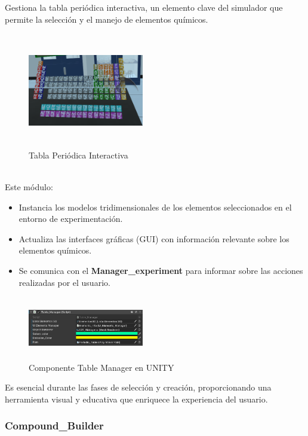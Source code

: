 \documentclass[conference]{IEEEtran}
\begin{document}
Gestiona la tabla periódica interactiva, un elemento clave del simulador que permite la selección y el manejo de elementos químicos. 
\begin{figure}[thbp]
    \centering
    \includegraphics[width=0.45\textwidth, height = 5cm]{img/GUI/Tabla_Periodica.png}
    \caption{Tabla Periódica Interactiva}
    \label{fig:Tabla Periódica Interactiva}
\end{figure}
\\
Este módulo:
\begin{itemize}
    \item Instancia los modelos tridimensionales de los elementos seleccionados en el entorno de experimentación.
    \item Actualiza las interfaces gráficas (GUI) con información relevante sobre los elementos químicos.
    \item Se comunica con el \textbf{Manager\_experiment} para informar sobre las acciones realizadas por el usuario.
\end{itemize}
\begin{figure}[thbp]
    \centering
    \includegraphics[width=0.45\textwidth, height = 2.75cm]{img/Table_Manager.png}
    \caption{Componente Table Manager en UNITY}
    \label{fig:Componente Table Manager en UNITYs}
\end{figure}
Es esencial durante las fases de selección y creación, proporcionando una herramienta visual y educativa que enriquece la experiencia del usuario.

\subsubsection{Compound\_Builder}
\end{document}
